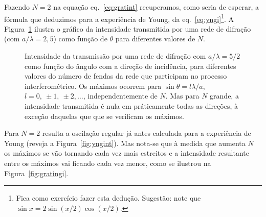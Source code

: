 Fazendo $N=2$ na equação eq.~\eqref{eq:gratint} recuperamos, como seria de
esperar, a fórmula que deduzimos para a experiência de Young, da
eq.~\eqref{eq:yngi}\footnote{Fica como exercício fazer esta dedução.
  Sugestão: note que $\sin x=2\sin(x/2)\cos(x/2)$.}. A Figura~\ref{fig:gratint2}
ilustra o gráfico da intensidade transmitida por uma rede de difração (com
$a/\lambda=2,5$) como função de $\theta$ para diferentes valores de $N$.
\begin{figure}[htb]
  {\centering
    \par
  }
  \caption{\label{fig:gratint2}Intensidade da transmissão por uma rede de
    difração com $a/\lambda=5/2$ como função do ângulo com a direção de
    incidência, para diferentes valores do número de fendas da rede que
    participam no processo interferométrico. Os máximos ocorrem para
    $\sin\theta=l\lambda/a$, $l=0,\ \pm1,\ \pm2, \ldots$, independentemente de
    $N$. Mas para $N$ grande, a intensidade transmitida é nula em práticamente
    todas as direções, à exceção daquelas que que se verificam os máximos.}
\end{figure}
Para $N=2$ resulta a oscilação regular já antes calculada para a experiência de
Young (reveja a Figura~\ref{fig:yngint}). Mas nota-se que à medida que aumenta
$N$ os máximos se vão tornando cada vez mais estreitos e a intensidade
resultante entre os máximos vai ficando cada vez menor, como se ilustrou na
Figura~\ref{fig:gratingi}.



